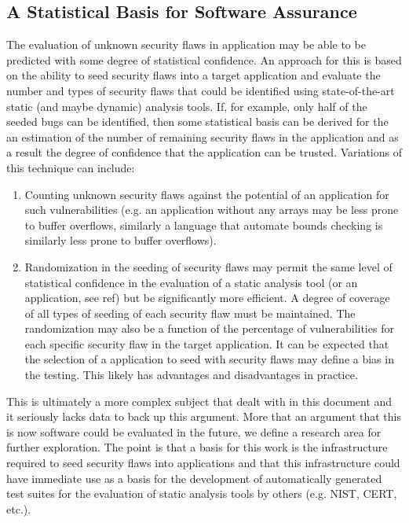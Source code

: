 \subsection{A Statistical Basis for Software Assurance}
\label{sec:NewResearchArea}
    The evaluation of unknown security flaws in application may be able to
be predicted with some degree of statistical confidence.  An approach for this
is based on the ability to seed security flaws into a target application and 
evaluate the number and types of security flaws that could be identified
using state-of-the-art static (and maybe dynamic) analysis tools.  If, for example,
only half of the seeded bugs can be identified, then some statistical basis
can be derived for the an estimation of the number of remaining security flaws in 
the application and as a result the degree of confidence that the application 
can be trusted.  Variations of this technique can include:
\begin{enumerate}
   \item Counting unknown security flaws against the potential of an application for such
         vulnerabilities (e.g. an application without any arrays may be less prone to
         buffer overflows, similarly a language that automate bounds checking is similarly
         less prone to buffer overflows). 

   \item Randomization in the seeding of security flaws may permit the same level of
         statistical confidence in the evaluation of a static analysis tool (or an
         application, see ref{}) but be significantly more efficient.  A degree of
         coverage of all types of seeding of each security flaw must be maintained.
         The randomization may also be a function of the percentage of vulnerabilities 
         for each specific security flaw in the target application.  It can be expected
         that the selection of a application to seed with security flaws may define a 
         bias in the testing.  This likely has advantages and disadvantages in practice.
 
\end{enumerate}

This is ultimately a more complex subject that dealt with in this
document and it seriously lacks data to back up this argument.  More that an argument
that this is now software could be evaluated in the future, we define a research
area for further exploration.  The point is that a basis for this work is the
infrastructure required to seed security flaws into applications and that 
this infrastructure could have immediate use as a basis for the development of
automatically generated test suites for the evaluation of static analysis tools
by others (e.g. NIST, CERT, etc.).

